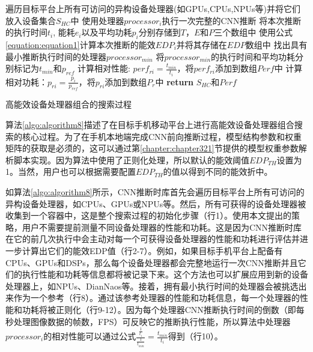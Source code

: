 \begin{algorithm}[htbp]
  \small
  \SetAlgoLined
    \begin{spacing}{0.8}
    遍历目标平台上所有可访问的异构设备处理器(如GPUs,CPUs,NPUs等)并将它们放入设备集合$S_{HC}$中\;
     {
        使用处理器$processor_i$执行一次完整的CNN推断\;
        将本次推断的执行时间$t_i$, 能耗$e_i$以及平均功耗$p_i$分别存储到$T$，$E$和$P$三个数组中\;
        使用公式\ref{equation:equation1}计算本次推断的能效$EDP_i$并将其存储在$EDP$数组中\;
    }
    找出具有最小推断执行时间的处理器$processor_{min}$\;
    将$processor_{min}$的执行时间和平均功耗分别标记为$t_{min}$和$p_{ref}$\;
     {
    计算相对性能: $perf_{ri} = \frac{t_{min}}{t_i}$，将$perf_{ri}$添加到数组$Perf$中\;
    计算相对功耗：$p_{ri} = \frac{p_{i}}{p_{ref}}$，将$p_{ri}$添加到数组$P_r$中\;
    }
    \textbf{return} $S_{HC}$和$Perf$\;
   \end{spacing}
  \caption{高能效设备处理器组合的搜索过程}
  \label{algo:algorithm8}
\end{algorithm}

算法\ref{algo:algorithm8}描述了在目标手机移动平台上进行高能效设备处理器组合搜索的核心过程。为了在手机本地端完成CNN前向推断过程，模型结构参数和权重矩阵的获取是必须的，这可以通过第\ref{chapter:chapter321}节提供的模型权重参数解析脚本实现。因为算法中使用了正则化处理，所以默认的能效阈值$EDP_{TH}$设置为1。当然，用户也可以根据需要配置$EDP_{TH}$的值以得到不同的能效折中。

如算法\ref{algo:algorithm8}所示，CNN推断时库首先会遍历目标平台上所有可访问的异构设备处理器，如CPUs、GPUs或NPUs等。然后，所有可获得的设备处理器被收集到一个容器中，这是整个搜索过程的初始化步骤（行1）。使用本文提出的策略，用户不需要提前测量不同设备处理器的性能和功耗。这是因为CNN推断时库在它的前几次执行中会主动对每一个可获得设备处理器的性能和功耗进行评估并进一步计算出它们的能效EDP值（行2-7）。例如，如果目标手机平台上配备有CPUs、GPUs和DSPs，那么每个设备处理器都会完整地运行一次CNN推断并且它们的执行性能和功耗等信息都将被记录下来。这个方法也可以扩展应用到新的设备处理器上，如NPUs、DianNaos\cite{chen2014diannao}等。接着，拥有最小执行时间的处理器会被挑选出来作为一个参考（行8）。通过该参考处理器的性能和功耗信息，每一个处理器的性能和功耗将被正则化（行9-12）。因为每个处理器CNN推断执行时间的倒数（即每秒处理图像数据的帧数，FPS）可反映它的推断执行性能，所以算法中处理器$processor_i$的相对性能可以通过公式$\frac{\frac{1}{t_i}}{\frac{1}{t_{min}}}=\frac{t_{min}}{t_i}$得到（行10）。

